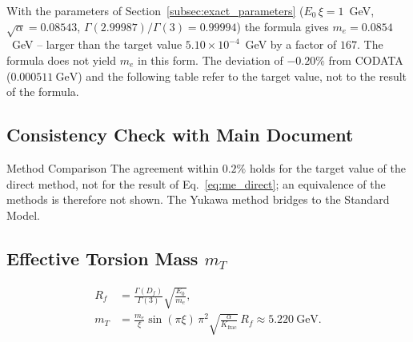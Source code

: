 	With the parameters of Section~\ref{subsec:exact_parameters} ($E_0\,\xi = 1$~GeV, $\sqrt{\alpha} = 0.08543$, $\Gamma(2.99987)/\Gamma(3) = 0.99994$) the formula gives $m_e = 0.0854$~GeV -- larger than the target value $5.10\times10^{-4}$~GeV by a factor of $167$. The formula does not yield $m_e$ in this form. The deviation of $-0.20\%$ from CODATA ($\SI{0.000511}{\giga\electronvolt}$) and the following table refer to the target value, not to the result of the formula.
	
	\subsection{Consistency Check with Main Document}
	\label{subsec:consistency_check}
	
	\begin{table}[H]
		\centering
		\caption{Consistency of mass calculation methods in T0-theory}
		\label{tab:method_consistency}
	\end{table}
	
	\begin{result}{Method Comparison}{}
		The agreement within $0.2\%$ holds for the target value of the direct method, not for the result of Eq.~\eqref{eq:me_direct}; an equivalence of the methods is therefore not shown. The Yukawa method bridges to the Standard Model.
	\end{result}
	
	\subsection{Effective Torsion Mass $m_T$}
	\label{subsec:torsion_mass}
	
	\begin{align}
		R_f &= \frac{\Gamma(D_f)}{\Gamma(3)} \sqrt{\frac{E_0}{m_e}}, \label{eq:Rf} \\
		m_T &= \frac{m_e}{\xi} \sin(\pi \xi) \, \pi^2 \sqrt{\frac{\alpha}{K_{\text{frac}}}} \, R_f \approx \SI{5.220}{\giga\electronvolt}. \label{eq:mT}
	\end{align}
	

